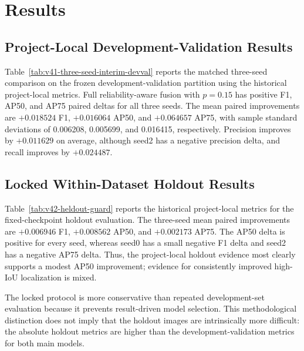 \begin{table}[t]
\caption{Implementation and reproducibility settings.}
\label{tab:implementation-and-reproducibility-settings}
\centering

\end{table}

\section{Results}

\subsection{Project-Local Development-Validation Results}

Table~\ref{tab:v41-three-seed-interim-devval} reports the matched three-seed comparison on the frozen development-validation partition using the historical project-local metrics. Full reliability-aware fusion with $p=0.15$ has positive F1, AP50, and AP75 paired deltas for all three seeds. The mean paired improvements are $+0.018524$ F1, $+0.016064$ AP50, and $+0.064657$ AP75, with sample standard deviations of 0.006208, 0.005699, and 0.016415, respectively. Precision improves by $+0.011629$ on average, although seed2 has a negative precision delta, and recall improves by $+0.024487$.



\subsection{Locked Within-Dataset Holdout Results}

Table~\ref{tab:v42-heldout-guard} reports the historical project-local metrics for the fixed-checkpoint holdout evaluation. The three-seed mean paired improvements are $+0.006946$ F1, $+0.008562$ AP50, and $+0.002173$ AP75. The AP50 delta is positive for every seed, whereas seed0 has a small negative F1 delta and seed2 has a negative AP75 delta. Thus, the project-local holdout evidence most clearly supports a modest AP50 improvement; evidence for consistently improved high-IoU localization is mixed.

The locked protocol is more conservative than repeated development-set evaluation because it prevents result-driven model selection. This methodological distinction does not imply that the holdout images are intrinsically more difficult: the absolute holdout metrics are higher than the development-validation metrics for both main models.

